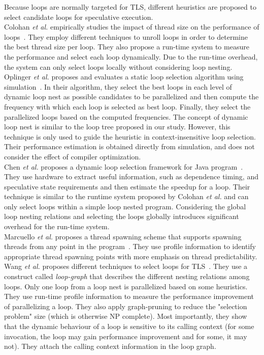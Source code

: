 \documentclass[10pt]{report}          %
\begin{document}
Because loops are normally targeted for TLS, different heuristics are proposed to select candidate loops for speculative execution.\\
Colohan \textit{et al.} empirically studies the impact of thread size on the performance of loops~\cite{colohan1}. They employ different techniques to unroll loops in order to determine the best thread size per loop. They also propose a run-time system to measure the performance and select each loop dynamically. Due to the run-time overhead, the system can only select loops locally without considering loop nesting.\\
Oplinger \textit{et al.} proposes and evaluates a static loop selection algorithm using simulation~\cite{olukotun}. In their algorithm, they select the best loops in each level of dynamic loop nest as possible candidates to be parallelized and then compute the frequency with which each loop is selected as best loop. Finally, they select the parallelized loops based on the computed frequencies. The concept of dynamic loop nest is similar to the loop tree proposed in our study. However, this technique is only used to guide the heuristic in context-insensitive loop selection. Their performance estimation is obtained directly from simulation, and does not consider the effect of compiler optimization.\\
Chen \textit{et al.} proposes a dynamic loop selection framework for Java program~\cite{chen1}. They use hardware to extract useful information, such as dependence timing, and speculative state requirements and then estimate the speedup for a loop. Their technique is similar to the runtime system proposed by Colohan \textit{et al.} and can only select loops within a simple loop nested program. Considering the global loop nesting relations and selecting the loops globally introduces significant overhead for the run-time system.\\
Marcuello \textit{et al.} proposes a thread spawning scheme that supports spawning threads from any point in the program~\cite{marcuello}. They use profile information to identify appropriate thread spawning points with more emphasis on thread predictability.\\
Wang \textit{et al.} proposes different techniques to select loops for TLS~\cite{loopselection}.  They use a construct called \textit{loop-graph} that describes the different nesting relations among loops.  Only one loop from a loop nest is parallelized based on some heuristics.  They use run-time profile information to measure the performance improvement of parallelizing a loop.  They also apply graph-pruning to reduce the "selection problem" size (which is otherwise NP complete).  Most importantly, they show that the dynamic behaviour of a loop is sensitive to its calling context (for some invocation, the loop may gain performance improvement and for some, it may not).  They attach the calling context information in the loop graph.
\end{document}
